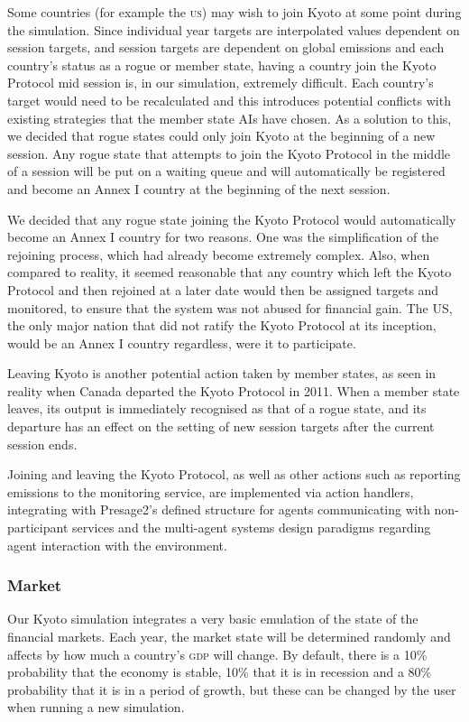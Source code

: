 Some countries (for example the \textsc{us}) may wish to join Kyoto at some point during the simulation. Since individual year targets are interpolated values dependent on session targets, and session targets are dependent on global emissions and each country's status as a rogue or member state, having a country join the Kyoto Protocol mid session is, in our simulation, extremely difficult. Each country's target would need to be recalculated and this introduces potential conflicts with existing strategies that the member state AIs have chosen. As a solution to this, we decided that rogue states could only join Kyoto at the beginning of a new session. Any rogue state that attempts to join the Kyoto Protocol in the middle of a session will be put on a waiting queue and will automatically be registered and become an Annex I country at the beginning of the next session.

We decided that any rogue state joining the Kyoto Protocol would automatically become an Annex I country for two reasons. One was the simplification of the rejoining process, which had already become extremely complex. Also, when compared to reality, it seemed reasonable that any country which left the Kyoto Protocol and then rejoined at a later date would then be assigned targets and monitored, to ensure that the system was not abused for financial gain. The US, the only major nation that did not ratify the Kyoto Protocol at its inception, would be an Annex I country regardless, were it to participate.

Leaving Kyoto is another potential action taken by member states, as seen in reality when Canada departed the Kyoto Protocol in 2011. When a member state leaves, its output is immediately recognised as that of a rogue state, and its departure has an effect on the setting of new session targets after the current session ends.   
 
Joining and leaving the Kyoto Protocol, as well as other actions such as reporting \CO emissions to the monitoring service, are implemented via action handlers, integrating with Presage2's defined structure for agents communicating with non-participant services and the multi-agent systems design paradigms regarding agent interaction with the environment.

\subsubsection{Market}

Our Kyoto simulation integrates a very basic emulation of the state of the financial markets. Each year, the market state will be determined randomly and affects by how much a country's \textsc{gdp} will change. By default, there is a 10\% probability that the economy is stable, 10\% that it is in recession and a 80\% probability that it is in a period of growth, but these can be changed by the user when running a new simulation.

